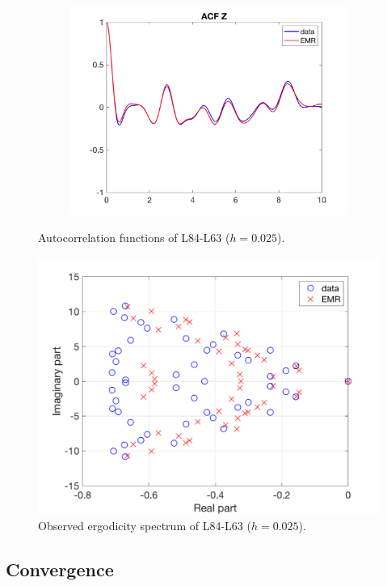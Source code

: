 \documentclass[12pt]{article}
\begin{document}
\begin{figure}[H]
\begin{subfigure}[b]{0.3\textwidth}
		\includegraphics[width=\textwidth]{plots/l84l63/acfzl840025.png}
	\end{subfigure}
	\caption{Autocorrelation functions of L84-L63 ($h=0.025$).}
\end{figure}

\begin{figure}[H]
	\centering
	\includegraphics[width=\textwidth]{plots/l84l63/especl840025.png}
	\caption{Observed ergodicity spectrum of L84-L63 ($h=0.025$).}
\end{figure}

\subsection{Convergence}
\end{document}
